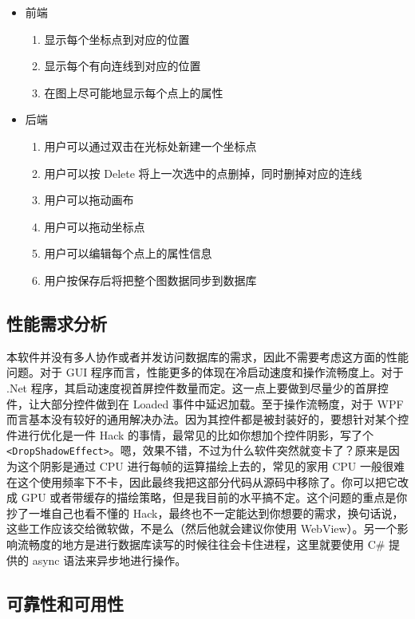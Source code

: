 \begin{itemize}
  \item 前端
  \begin{enumerate}
    \item 显示每个坐标点到对应的位置
    \item 显示每个有向连线到对应的位置
    \item 在图上尽可能地显示每个点上的属性
  \end{enumerate}
  \item 后端
  \begin{enumerate}
    \item 用户可以通过双击在光标处新建一个坐标点
    \item 用户可以按 Delete 将上一次选中的点删掉，同时删掉对应的连线
    \item 用户可以拖动画布
    \item 用户可以拖动坐标点
    \item 用户可以编辑每个点上的属性信息
    \item 用户按保存后将把整个图数据同步到数据库
  \end{enumerate}
\end{itemize}

\subsection{性能需求分析}

本软件并没有多人协作或者并发访问数据库的需求，因此不需要考虑这方面的性能问题。对于 GUI 程序而言，性能更多的体现在冷启动速度和操作流畅度上。对于 .Net 程序，其启动速度视首屏控件数量而定。这一点上要做到尽量少的首屏控件，让大部分控件做到在 Loaded 事件中延迟加载。至于操作流畅度，对于 WPF 而言基本没有较好的通用解决办法。\cite{url:optiwpf}因为其控件都是被封装好的，要想针对某个控件进行优化是一件 Hack 的事情，最常见的比如你想加个控件阴影，写了个 \texttt{<DropShadowEffect>}。嗯，效果不错，不过为什么软件突然就变卡了？原来是因为这个阴影是通过 CPU 进行每帧的运算描绘上去的，常见的家用 CPU 一般很难在这个使用频率下不卡，因此最终我把这部分代码从源码中移除了。你可以把它改成 GPU 或者带缓存的描绘策略，但是我目前的水平搞不定。这个问题的重点是你抄了一堆自己也看不懂的 Hack，最终也不一定能达到你想要的需求，换句话说，这些工作应该交给微软做，不是么（然后他就会建议你使用 WebView）。另一个影响流畅度的地方是进行数据库读写的时候往往会卡住进程，这里就要使用 C\# 提供的 async 语法来异步地进行操作。

\subsection{可靠性和可用性}

